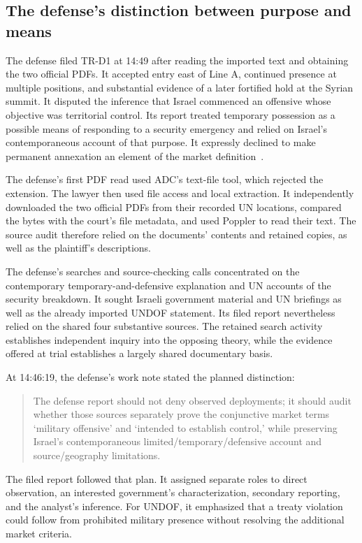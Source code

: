 \documentclass[11pt]{article}
\begin{document}
\subsection{The defense's distinction between purpose and means}

The defense filed TR-D1 at 14:49 after reading the imported text and obtaining the two official PDFs.  It accepted entry east of Line A, continued presence at multiple positions, and substantial evidence of a later fortified hold at the Syrian summit.  It disputed the inference that Israel commenced an offensive whose objective was territorial control.  Its report treated temporary possession as a possible means of responding to a security emergency and relied on Israel's contemporaneous account of that purpose.  It expressly declined to make permanent annexation an element of the market definition~\cite[events 16--22 and file 0007]{record}.

The defense's first PDF read used ADC's text-file tool, which rejected the extension.  The lawyer then used file access and local extraction.  It independently downloaded the two official PDFs from their recorded UN locations, compared the bytes with the court's file metadata, and used Poppler to read their text.  The source audit therefore relied on the documents' contents and retained copies, as well as the plaintiff's descriptions.

The defense's searches and source-checking calls concentrated on the contemporary temporary-and-defensive explanation and UN accounts of the security breakdown.  It sought Israeli government material and UN briefings as well as the already imported UNDOF statement.  Its filed report nevertheless relied on the shared four substantive sources.  The retained search activity establishes independent inquiry into the opposing theory, while the evidence offered at trial establishes a largely shared documentary basis.

At 14:46:19, the defense's work note stated the planned distinction:
\begin{quote}
The defense report should not deny observed deployments; it should audit whether those sources separately prove the conjunctive market terms ‘military offensive’ and ‘intended to establish control,’ while preserving Israel's contemporaneous limited/temporary/defensive account and source/geography limitations.
\end{quote}
The filed report followed that plan.  It assigned separate roles to direct observation, an interested government's characterization, secondary reporting, and the analyst's inference.  For UNDOF, it emphasized that a treaty violation could follow from prohibited military presence without resolving the additional market criteria.
\end{document}
